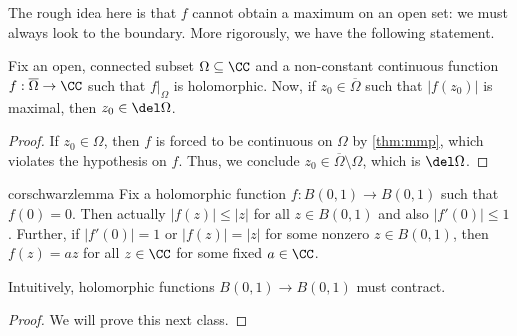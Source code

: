 The rough idea here is that $f$ cannot obtain a maximum on an open set: we must always look to the boundary. More rigorously, we have the following statement.
\begin{corollary} \label{cor:mmp}
	Fix an open, connected subset $\Omega\subseteq\CC$ and a non-constant continuous function $f:\overline\Omega\to\CC$ such that $f|_\Omega$ is holomorphic. Now, if $z_0\in\overline\Omega$ such that $|f(z_0)|$ is maximal, then $z_0\in\del\Omega$.
\end{corollary}
\begin{proof}
	If $z_0\in\Omega$, then $f$ is forced to be continuous on $\Omega$ by \autoref{thm:mmp}, which violates the hypothesis on $f$. Thus, we conclude $z_0\in\overline\Omega\setminus\Omega$, which is $\del\Omega$.
\end{proof}
\begin{restatable}{cor}{schwarzlemma} \label{cor:schwarz}
	Fix a holomorphic function $f:B(0,1)\to B(0,1)$ such that $f(0)=0$. Then actually $|f(z)|\le|z|$ for all $z\in B(0,1)$ and also $|f'(0)|\le1$. Further, if $|f'(0)|=1$ or $|f(z)|=|z|$ for some nonzero $z\in B(0,1)$, then $f(z)=az$ for all $z\in\CC$ for some fixed $a\in\CC$.
\end{restatable}
Intuitively, holomorphic functions $B(0,1)\to B(0,1)$ must contract.
\begin{proof}
	We will prove this next class.
\end{proof}